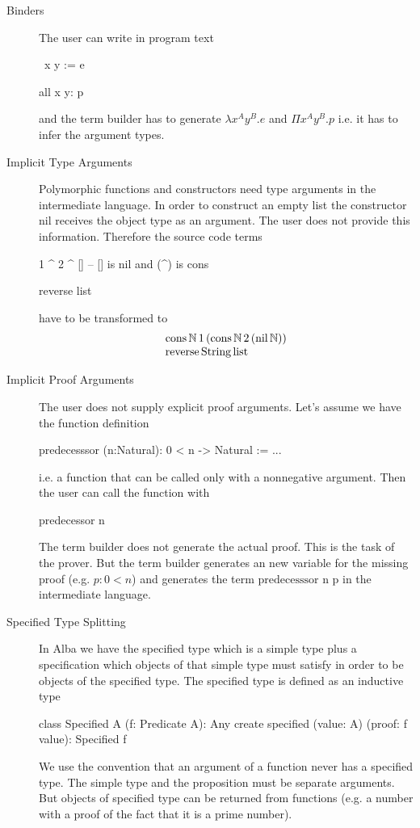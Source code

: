 \begin{description}

\item[Binders]
  The user can write in program text
  \begin{alba}
    \ x y := e

    all x y: p
  \end{alba}
  and the term builder has to generate $\lambda x^A y^B. e$ and $\Pi
  x^A y^B  . p$ i.e. it has to infer the argument types.


\item[Implicit Type Arguments]
  Polymorphic functions and constructors need type arguments in the
  intermediate language. In order to construct an empty list the constructor
  $\text{nil}$ receives the object type as an argument. The user does not
  provide this information. Therefore the source code terms
  \begin{alba}
    1 ^ 2 ^ []           -- [] is nil and (^) is cons

    reverse list
  \end{alba}
  have to be transformed to
  $$
  \begin{array}{l}
    \text{cons}\, \Natural\, 1 \,(\text{cons}\, \Natural\, 2\, (\text{nil}\,
    \Natural))

    \\

    \text{reverse}\, \text{String} \, \text{list}
  \end{array}
  $$


\item[Implicit Proof Arguments]
  The user does not supply explicit proof arguments. Let's assume we have the
  function definition
  \begin{alba}
    predecesssor (n:Natural): 0 < n -> Natural := ...
  \end{alba}
  i.e. a function that can be called only with a nonnegative argument. Then
  the user can call the function with
  \begin{alba}
    predecessor n
  \end{alba}
  The term builder does not generate the actual proof. This is the task of the
  prover. But the term builder generates an new variable for the missing proof
  (e.g. $p: 0 < n$) and generates the term $\text{predecesssor n p}$ in the
  intermediate language.


\item[Specified Type Splitting]
  In Alba we have the specified type which is a simple type plus a
  specification which objects of that simple type must satisfy in order to be
  objects of the specified type. The specified type is defined as an inductive
  type
  \begin{alba}
    class Specified A (f: Predicate A): Any create
      specified (value: A) (proof: f value): Specified f
  \end{alba}
  We use the convention that an argument of a function never has a specified
  type. The simple type and the proposition must be separate arguments. But
  objects of specified type can be returned from functions (e.g. a number with
  a proof of the fact that it is a prime number).


\end{description}
